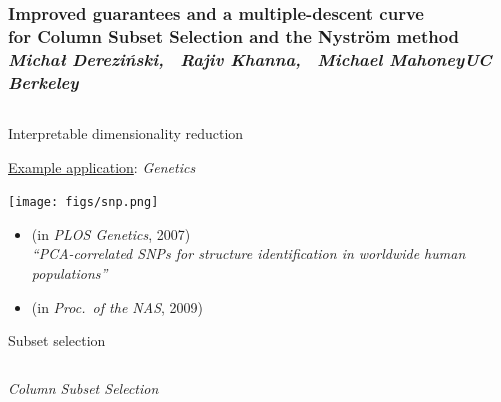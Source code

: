 \documentclass{beamer}
\edef\polishl{\l}
\begin{document}
\begin{frame}
  \frametitle{
    \centering\textrm{\textbf{\LARGE Improved guarantees
        and a multiple-descent curve}}\\
\centering\textrm{\textbf{\LARGE
  for Column Subset Selection and the Nystr\"om method}}\\[-2mm]
\textit{\large Micha{\polishl } Derezi\'{n}ski, \ Rajiv Khanna,
  \ Michael Mahoney\qquad UC Berkeley}\\[-5mm]
}
\begin{columns}
  \begin{column}{0.32\textwidth}

  \begin{block}{Interpretable dimensionality reduction}

  \underline{Example application}: \textit{Genetics}
  \begin{center}
    \texttt{[image: figs/snp.png]}
  \end{center}


  \begin{itemize}
  \item \cite{paschou2007pca} (in \textit{PLOS Genetics}, 2007) \\[-1mm]
{\scriptsize\textit{``PCA-correlated SNPs for structure
    identification in worldwide human populations''}}
  \item  \cite{mahoney2009cur} (in \textit{Proc.~of the NAS}, 2009)\\[-1mm]
  \end{itemize}
\end{block}
    
 \begin{block}{Subset selection}
    \begin{columns}
    \begin{column}{.43\textwidth}
      \begin{center}
        \emph{Column Subset Selection} \\[1mm]
\end{center}
\vspace{6mm}


\end{column}
\end{columns}
\end{block}
\end{column}
\end{columns}
\end{frame}
\end{document}

